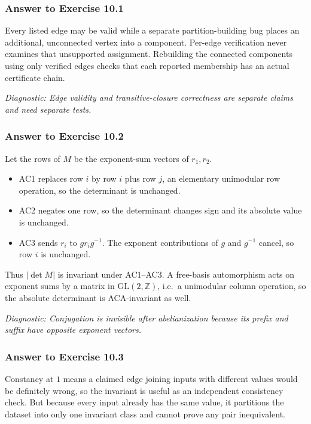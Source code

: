 \documentclass[11pt]{article}
\theoremstyle{definition}
\theoremstyle{remark}
\newcommand{\len}[1]{\left|#1\right|}
\newcommand{\diagnostic}[1]{\par\smallskip\textit{Diagnostic: #1}}
\begin{document}
\subsubsection*{Answer to Exercise 10.1}

Every listed edge may be valid while a separate partition-building bug
places an additional, unconnected vertex into a component.  Per-edge
verification never examines that unsupported assignment.  Rebuilding the
connected components using only verified edges checks that each reported
membership has an actual certificate chain.

\diagnostic{Edge validity and transitive-closure correctness are separate
claims and need separate tests.}

\subsubsection*{Answer to Exercise 10.2}

Let the rows of \(M\) be the exponent-sum vectors of \(r_1,r_2\).
\begin{itemize}
  \item AC1 replaces row \(i\) by row \(i\) plus row \(j\), an elementary
  unimodular row operation, so the determinant is unchanged.
  \item AC2 negates one row, so the determinant changes sign and its
  absolute value is unchanged.
  \item AC3 sends \(r_i\) to \(g r_i g^{-1}\).  The exponent contributions
  of \(g\) and \(g^{-1}\) cancel, so row \(i\) is unchanged.
\end{itemize}
Thus \(\len{\det M}\) is invariant under AC1--AC3.  A free-basis
automorphism acts on exponent sums by a matrix in
\(\mathrm{GL}(2,\mathbb Z)\), i.e.\ a unimodular column operation, so the
absolute determinant is ACA-invariant as well.

\diagnostic{Conjugation is invisible after abelianization because its
prefix and suffix have opposite exponent vectors.}

\subsubsection*{Answer to Exercise 10.3}

Constancy at \(1\) means a claimed edge joining inputs with different
values would be definitely wrong, so the invariant is useful as an
independent consistency check.  But because every input already has the
same value, it partitions the dataset into only one invariant class and
cannot prove any pair inequivalent.
\end{document}
